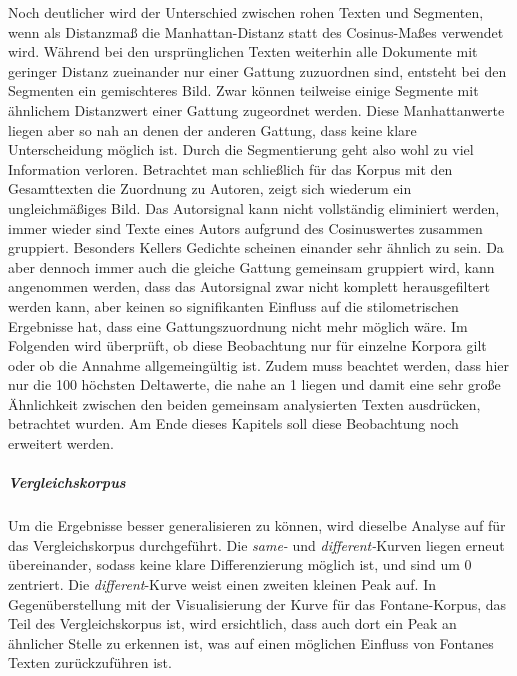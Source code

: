 \documentclass[a4paper,10p]{article}
\begin{document}
Noch deutlicher wird der Unterschied zwischen rohen Texten und Segmenten, wenn als Distanzmaß die Manhattan-Distanz statt des Cosinus-Maßes verwendet wird. Während bei den ursprünglichen Texten weiterhin alle Dokumente mit geringer Distanz zueinander nur einer Gattung zuzuordnen sind, entsteht bei den Segmenten ein gemischteres Bild. Zwar können teilweise einige Segmente mit ähnlichem Distanzwert einer Gattung zugeordnet werden. Diese Manhattanwerte liegen aber so nah an denen der anderen Gattung, dass keine klare Unterscheidung möglich ist. Durch die Segmentierung geht also wohl zu viel Information verloren. Betrachtet man schließlich für das Korpus mit den Gesamttexten die Zuordnung zu Autoren, zeigt sich wiederum ein ungleichmäßiges Bild. Das Autorsignal kann nicht vollständig eliminiert werden, immer wieder sind Texte eines Autors aufgrund des Cosinuswertes zusammen gruppiert. Besonders Kellers Gedichte scheinen einander sehr ähnlich zu sein. Da aber dennoch immer auch die gleiche Gattung gemeinsam gruppiert wird, kann angenommen werden, dass das Autorsignal zwar nicht komplett herausgefiltert werden kann, aber keinen so signifikanten Einfluss auf die stilometrischen Ergebnisse hat, dass eine Gattungszuordnung nicht mehr möglich wäre. Im Folgenden wird überprüft, ob diese Beobachtung nur für einzelne Korpora gilt oder ob die Annahme allgemeingültig ist. Zudem muss beachtet werden, dass hier nur die 100 höchsten Deltawerte, die nahe an 1 liegen und damit eine sehr große Ähnlichkeit zwischen den beiden gemeinsam analysierten Texten ausdrücken, betrachtet wurden. Am Ende dieses Kapitels soll diese Beobachtung noch erweitert werden. \par 

\subparagraph{Vergleichskorpus} \quad \par 
Um die Ergebnisse besser generalisieren zu können, wird dieselbe Analyse auf für das Vergleichskorpus durchgeführt. Die \textit{same-} und  \textit{different-}Kurven liegen erneut übereinander, sodass keine klare Differenzierung möglich ist, und sind um 0 zentriert. Die \textit{different}-Kurve weist einen zweiten kleinen Peak auf. In Gegenüberstellung mit der Visualisierung der Kurve für das Fontane-Korpus, das Teil des Vergleichskorpus ist, wird ersichtlich, dass auch dort ein Peak an ähnlicher Stelle zu erkennen ist, was auf einen möglichen Einfluss von Fontanes Texten zurückzuführen ist. \par 
\end{document}
